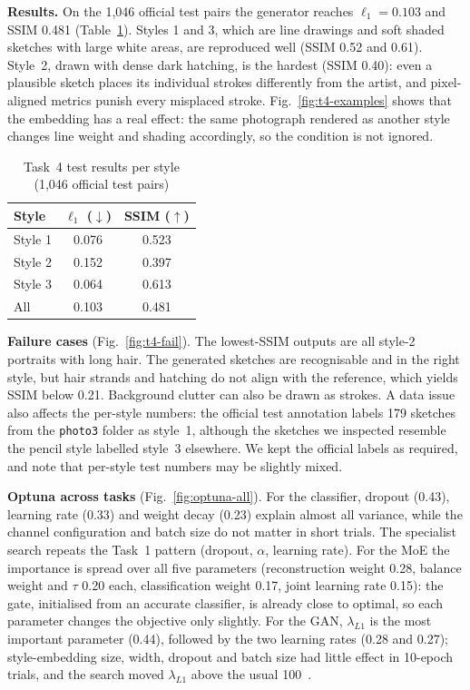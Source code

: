\documentclass[conference]{IEEEtran}
\begin{document}
\textbf{Results.} On the 1,046 official test pairs the generator reaches $\ell_1=0.103$ and SSIM 0.481
(Table~\ref{tab:t4}). Styles 1 and 3, which are line drawings and soft shaded sketches with large white areas, are
reproduced well (SSIM 0.52 and 0.61). Style~2, drawn with dense dark hatching, is the hardest (SSIM 0.40): even a
plausible sketch places its individual strokes differently from the artist, and pixel-aligned metrics punish every
misplaced stroke. Fig.~\ref{fig:t4-examples} shows that the embedding has a real effect: the same photograph rendered
as another style changes line weight and shading accordingly, so the condition is not ignored.

\begin{table}[!htbp]
\centering\caption{Task~4 test results per style (1,046 official test pairs)}\label{tab:t4}
\scriptsize
\begin{tabular}{@{}lcc@{}}
\toprule
Style & $\ell_1$ ($\downarrow$) & SSIM ($\uparrow$)\\
\midrule
Style 1 & 0.076 & 0.523\\
Style 2 & 0.152 & 0.397\\
Style 3 & 0.064 & 0.613\\
\midrule
All & 0.103 & 0.481\\
\bottomrule
\end{tabular}
\end{table}

\textbf{Failure cases} (Fig.~\ref{fig:t4-fail}). The lowest-SSIM outputs are all style-2 portraits with long hair. The
generated sketches are recognisable and in the right style, but hair strands and hatching do not align with the
reference, which yields SSIM below 0.21. Background clutter can also be drawn as strokes. A data issue also affects
the per-style numbers: the official test annotation labels 179 sketches from the \texttt{photo3} folder as style~1,
although the sketches we inspected resemble the pencil style labelled style~3 elsewhere. We kept the official labels
as required, and note that per-style test numbers may be slightly mixed.

\textbf{Optuna across tasks} (Fig.~\ref{fig:optuna-all}). For the classifier, dropout (0.43), learning rate (0.33)
and weight decay (0.23) explain almost all variance, while the channel configuration and batch size do not matter in
short trials. The specialist search repeats the Task~1 pattern (dropout, $\alpha$, learning rate). For the MoE the
importance is spread over all five parameters (reconstruction weight 0.28, balance weight and $\tau$ 0.20 each,
classification weight 0.17, joint learning rate 0.15): the gate, initialised from an accurate classifier, is already
close to optimal, so each parameter changes the objective only slightly. For the GAN, $\lambda_{L1}$ is the most
important parameter (0.44), followed by the two learning rates (0.28 and 0.27); style-embedding size, width, dropout
and batch size had little effect in 10-epoch trials, and the search moved $\lambda_{L1}$ above the usual
100~\cite{isola2017}.
\end{document}
